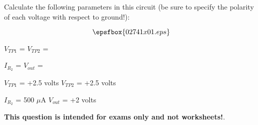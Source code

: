 

Calculate the following parameters in this circuit (be sure to specify the polarity of each voltage with respect to ground!):

$$\epsfbox{02741x01.eps}$$

$V_{TP1}$ = \hskip 80pt $V_{TP2}$ =

\vskip 10pt

$I_{R_2}$ = \hskip 80pt $V_{out}$ =







$V_{TP1}$ = +2.5 volts \hskip 50pt $V_{TP2}$ = +2.5 volts

\vskip 10pt

$I_{R_2}$ = 500 $\mu$A \hskip 50pt $V_{out}$ = +2 volts







{\bf This question is intended for exams only and not worksheets!}.




